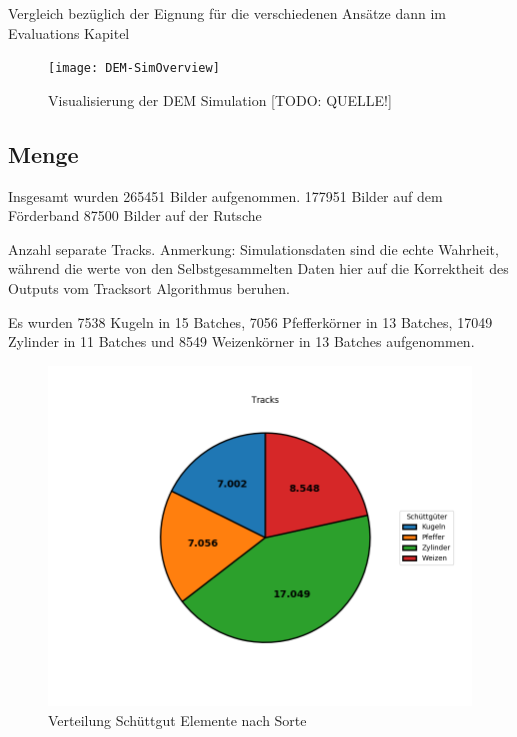 Vergleich bezüglich der Eignung für die verschiedenen Ansätze dann im Evaluations Kapitel

\begin{figure}
    \centering
	\texttt{[image: DEM-SimOverview]}
	\caption{Visualisierung der DEM Simulation [TODO: QUELLE!]}
	\label{fig:DEMSimulation}
\end{figure}


\subsection{Menge}

Insgesamt wurden 265451 Bilder aufgenommen.
177951 Bilder auf dem Förderband
87500 Bilder auf der Rutsche


Anzahl separate Tracks.
Anmerkung: Simulationsdaten sind die echte Wahrheit, während die werte von den Selbstgesammelten Daten hier 
auf die Korrektheit des Outputs vom Tracksort Algorithmus beruhen. 

Es wurden 
7538 Kugeln in 15 Batches,
7056 Pfefferkörner in 13 Batches,
17049 Zylinder in 11 Batches
und 8549 Weizenkörner in 13 Batches aufgenommen.


\begin{figure}
    \centering
    \includegraphics[width=\textwidth]{img/scaledPieChart-trimmed}
    \caption{Verteilung Schüttgut Elemente nach Sorte}
    \label{piechartSchuettgut}
\end{figure}


